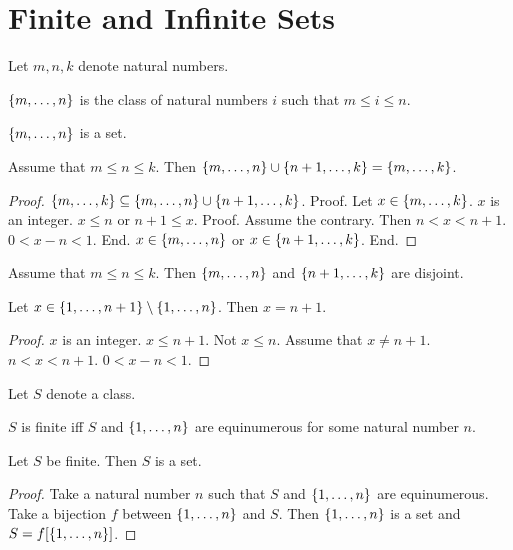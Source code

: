 \documentclass{article}
\begin{document}
  \section{Finite and Infinite Sets}
  
  \begin{forthel}
  Let $m,n,k$ denote natural numbers.
  
  \begin{definition}
  $\{m,\dots,n\}$ is the class of
  natural numbers $i$ such that $m \leq i \leq n$.
  \end{definition}
  
  \begin{lemma}
  $\{m,\dots,n\}$ is a set.
  \end{lemma}
  
  \begin{lemma} 
  Assume that $m \leq n \leq k$.
  Then $\{m,\dots,n\} \cup \{n+1,\dots,k\} = \{m,\dots,k\}$.
  \end{lemma}
  \begin{proof}
  $\{m,\dots,k\} \subseteq \{m,\dots,n\} \cup \{n+1,\dots,k\}$.
  Proof.
  Let $x \in \{m,\dots,k\}$. $x$ is an integer. 
  $x \leq n$ or $n+1 \leq x$. Proof. Assume the contrary. Then $n < x < n+1$. $0 < x - n < 1$. End.
  $x \in \{m,\dots,n\}$ or $x \in \{n+1,\dots,k\}$. End.
  \end{proof}
  
  
  \begin{lemma} Assume that $m \leq n \leq k$.
  Then $\{m,\dots,n\}$ and $\{n+1,\dots,k\}$ are disjoint.
  \end{lemma}
  
  \begin{lemma} Let $x \in \{1,\dots,n+1\} \setminus \{1,\dots,n\}$.
  Then $x = n+1$.
  \end{lemma}
  \begin{proof}
  $x$ is an integer.
  $x \leq n+1$. Not $x \leq n$.
  Assume that $x \neq n+1$.
  $n < x < n+1$.
  $0 < x - n < 1$.
  \end{proof}
  
  Let $S$ denote a class.
  
  \begin{definition}
  $S$ is finite iff $S$ and $\{1,\dots,n\}$ are equinumerous for some 
  natural number $n$.
  \end{definition}
  
  \begin{lemma}
  Let $S$ be finite. Then $S$ is a set.
  \end{lemma}
  \begin{proof}
  Take a natural number $n$ such that $S$ and $\{1,\dots,n\}$ are equinumerous.
  Take a bijection $f$ between $\{1,\dots,n\}$ and $S$.
  Then $\{1,\dots,n\}$ is a set and $S = f[\{1,\dots,n\}]$.
  \end{proof}
  \end{forthel}
\end{document}
